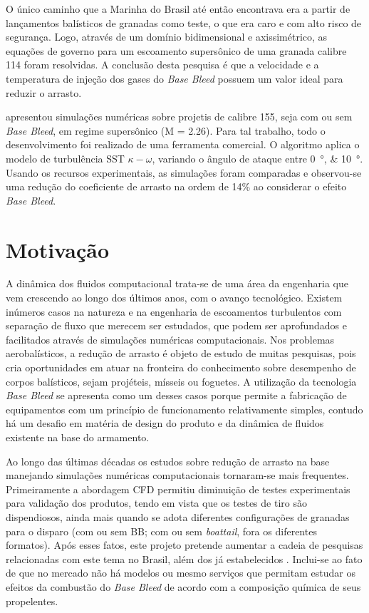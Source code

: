 O único caminho que a Marinha do Brasil até então encontrava era a partir de lançamentos balísticos de granadas como teste, o que era caro e com alto risco de segurança. Logo, através de um domínio bidimensional e axissimétrico, as equações de governo para um escoamento supersônico de uma granada calibre \qty{114}{\millimetre} foram resolvidas. A conclusão desta pesquisa é que a velocidade e a temperatura de injeção dos gases do \textit{Base Bleed} possuem um valor ideal para reduzir o arrasto.

\citeauthor{Reddy2021} apresentou simulações numéricas sobre projetis de calibre \qty{155}{\millimetre}, seja com ou sem \textit{Base Bleed}, em regime supersônico (M = \num{2,26}). Para tal trabalho, todo o desenvolvimento foi realizado de uma ferramenta comercial. O algoritmo aplica o modelo de turbulência SST \(\kappa-\omega\), variando o ângulo de ataque entre \qtylist{0;10}{\degree}. Usando os recursos experimentais, as simulações foram comparadas e observou-se uma redução do coeficiente de arrasto na ordem de 14\% ao considerar o efeito \textit{Base Bleed}. 

\section{Motivação}

A dinâmica dos fluidos computacional trata-se de uma área da engenharia que vem crescendo ao longo dos últimos anos, com o avanço tecnológico. Existem inúmeros casos na natureza e na engenharia de escoamentos turbulentos com separação de fluxo que merecem ser estudados, que podem ser aprofundados e facilitados através de simulações numéricas computacionais. Nos problemas aerobalísticos, a redução de arrasto é objeto de estudo de muitas pesquisas, pois cria oportunidades em atuar na fronteira do conhecimento sobre desempenho de corpos balísticos, sejam projéteis, mísseis ou foguetes. A utilização da tecnologia \textit{Base Bleed} se apresenta como um desses casos porque permite a fabricação de equipamentos com um princípio de funcionamento relativamente simples, contudo há um desafio em matéria de design do produto e da dinâmica de fluidos existente na base do armamento.

Ao longo das últimas décadas os estudos sobre redução de arrasto na base manejando simulações numéricas computacionais tornaram-se mais frequentes. Primeiramente a abordagem CFD permitiu diminuição de testes experimentais para validação dos produtos, tendo em vista que os testes de tiro são dispendiosos, ainda mais quando se adota diferentes configurações de granadas para o disparo (com ou sem BB; com ou sem \textit{boattail}, fora os diferentes formatos). Após esses fatos, este projeto pretende aumentar a cadeia de pesquisas relacionadas com este tema no Brasil, além dos já estabelecidos \cite{Lucena2020, Rosendo2020, Gil2020}. Inclui-se ao fato de que no mercado não há modelos ou mesmo serviços que permitam estudar os efeitos da combustão do \textit{Base Bleed} de acordo com a composição química de seus propelentes. 
	
